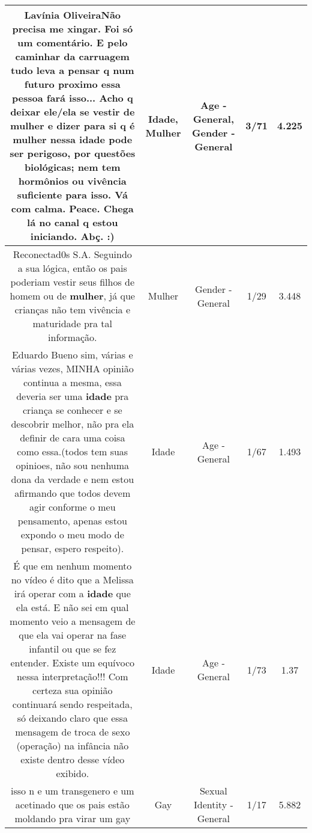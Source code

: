 \documentclass[11pt]{article}
\newlength\mylength
\begin{document}
\begin{center}
\begin{longtable}{|C{.65\mylength}|C{.30\mylength}|C{.12\mylength}|C{.12\mylength}|C{.12\mylength}|}
  \small Lavínia OliveiraNão precisa me xingar. Foi só um comentário. E pelo caminhar da carruagem tudo leva a pensar q num futuro proximo essa pessoa fará isso... Acho q deixar ele/ela se vestir de \textbf{mulher} e dizer para si q é \textbf{mulher} nessa \textbf{idade} pode ser perigoso, por questões biológicas; nem tem hormônios ou vivência suficiente para isso. Vá com calma. Peace. Chega lá no canal q estou iniciando. Abç. :)\normalsize   & Idade, Mulher & Age - General, Gender - General & 3/71 & 4.225 \\  \hline
  \small Reconectad0s S.A. Seguindo a sua lógica, então os pais poderiam vestir seus filhos de homem ou de \textbf{mulher}, já que crianças não tem vivência e maturidade pra tal informação.\normalsize   & Mulher & Gender - General & 1/29 & 3.448 \\  \hline
  \small Eduardo Bueno sim, várias e várias vezes, MINHA opinião continua a mesma, essa deveria ser uma \textbf{idade} pra criança se conhecer e se descobrir melhor, não pra ela definir de cara uma coisa como essa.(todos tem suas opinioes, não sou nenhuma dona da verdade e nem estou afirmando que todos devem agir conforme o meu pensamento, apenas estou expondo o meu modo de pensar, espero respeito).\normalsize   & Idade & Age - General & 1/67 & 1.493 \\  \hline
  \small É que em nenhum momento no vídeo é dito que a Melissa irá operar com a \textbf{idade} que ela está. E não sei em qual momento veio a mensagem de que ela vai operar na fase infantil ou que se fez entender. Existe um equívoco nessa interpretação!!! Com certeza sua opinião continuará sendo respeitada, só deixando claro que essa mensagem de troca de sexo (operação) na infância não existe dentro desse vídeo exibido.\normalsize   & Idade & Age - General & 1/73 & 1.37 \\  \hline
  \small isso n e um transgenero e um acetinado que os pais estão moldando pra virar um gay\normalsize   & Gay & Sexual Identity - General & 1/17 & 5.882 \\  \hline

\end{longtable}
\end{center}
\end{document}
